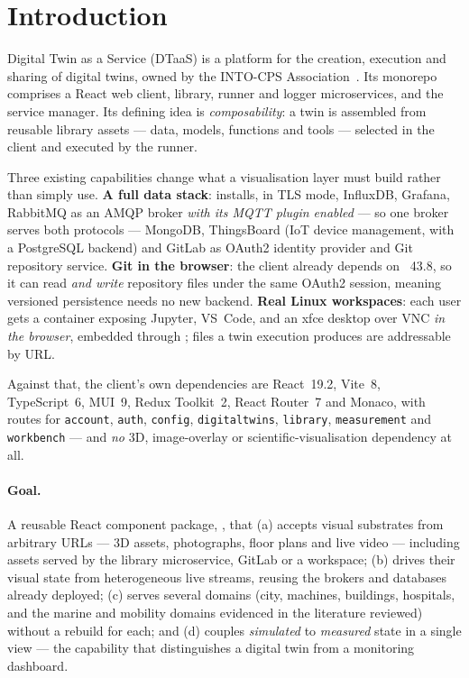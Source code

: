 \section{Introduction}
\label{sec:intro}

Digital Twin as a Service (DTaaS) is a platform for the creation, execution and sharing
of digital twins, owned by the INTO-CPS Association~\citep{talasila2024composable}. Its
monorepo comprises a React web client, library, runner and logger microservices, and the
 service manager. Its defining idea is \emph{composability}: a twin
is assembled from reusable library assets --- data, models, functions and tools ---
selected in the client and executed by the runner.

Three existing capabilities change what a visualisation layer must build rather than
simply use. \textbf{A full data stack}:  installs, in TLS mode,
InfluxDB, Grafana, RabbitMQ as an AMQP broker \emph{with its MQTT plugin enabled} --- so
one broker serves both protocols --- MongoDB, ThingsBoard (IoT device management, with a
PostgreSQL backend) and GitLab as OAuth2 identity provider and Git repository service.
\textbf{Git in the browser}: the client already depends on ~43.8, so
it can read \emph{and write} repository files under the same OAuth2 session, meaning
versioned persistence needs no new backend. \textbf{Real Linux workspaces}: each user
gets a container exposing Jupyter, VS~Code,  and an xfce desktop over VNC
\emph{in the browser}, embedded through ; files a twin execution
produces are addressable by URL.

Against that, the client's own dependencies are React~19.2, Vite~8, TypeScript~6, MUI~9,
Redux Toolkit~2, React Router~7 and Monaco, with routes for \texttt{account},
\texttt{auth}, \texttt{config}, \texttt{digitaltwins}, \texttt{library},
\texttt{measurement} and \texttt{workbench} --- and \emph{no} 3D, image-overlay or
scientific-visualisation dependency at all.

\paragraph{Goal.} A reusable React component package, , that
(a) accepts visual substrates from arbitrary URLs --- 3D assets, photographs, floor plans
and live video --- including assets served by the library microservice, GitLab or a
workspace; (b) drives their visual state from heterogeneous live streams, reusing the
brokers and databases already deployed; (c) serves several domains (city, machines,
buildings, hospitals, and the marine and mobility domains evidenced in the literature
reviewed) without a rebuild for each; and (d) couples \emph{simulated} to
\emph{measured} state in a single view --- the capability that distinguishes a digital
twin from a monitoring dashboard.


